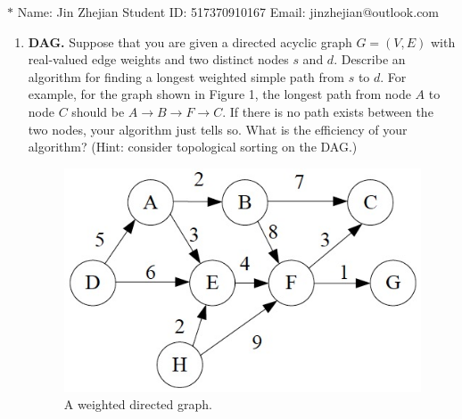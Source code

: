 \documentclass[12pt,a4paper]{article}
\theoremstyle{definition}
\begin{document}
\noindent

\noindent{}
\begin{center}

\footnotesize{\color{blue}$*$ Name: Jin Zhejian \quad Student ID: 517370910167 \quad Email: jinzhejian@outlook.com}
\end{center}


\begin{enumerate}

\item \textbf{DAG.} Suppose that you are given a directed acyclic graph $G=(V,E)$ with real-valued edge weights and two distinct nodes $s$ and $d$. Describe an algorithm for finding a longest weighted simple path from $s$ to $d$. For example, for the graph shown in Figure 1, the longest path from node $A$ to node $C$ should be $A \rightarrow B \rightarrow F \rightarrow C$. If there is no path exists between the two nodes, your algorithm just tells so. What is the efficiency of your algorithm? (Hint: consider topological sorting on the DAG.)



\begin{figure}[htbp]
\centering
\includegraphics[scale=0.35]{Lab08-figure1.jpg}
\caption{A weighted directed graph.}
\end{figure}



\end{enumerate}
\end{document}
